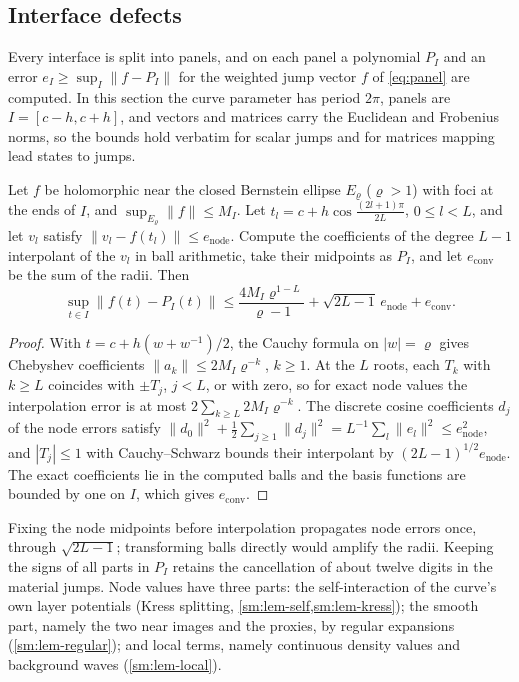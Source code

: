 \subsection{Interface defects}\label{sm:reliable-eps}
Every interface is split into panels, and on each panel a polynomial $P_I$ and an
error $e_I\ge\sup_I\|f-P_I\|$ for the weighted jump vector $f$ of \eqref{eq:panel}
are computed. In this section the curve parameter has period $2\pi$, panels are
$I=[c-h,c+h]$, and vectors and matrices carry the Euclidean and Frobenius norms,
so the bounds hold verbatim for scalar jumps and for matrices mapping lead states
to jumps.

\begin{lemma}\label{sm:lem-cheb}
Let $f$ be holomorphic near the closed Bernstein ellipse $E_\varrho$ ($\varrho>1$)
with foci at the ends of $I$, and $\sup_{E_\varrho}\|f\|\le M_I$. Let
$t_l=c+h\cos\frac{(2l+1)\pi}{2L}$, $0\le l<L$, and let $v_l$ satisfy
$\|v_l-f(t_l)\|\le e_{\mathrm{node}}$. Compute the coefficients of the degree $L-1$
interpolant of the $v_l$ in ball arithmetic, take their midpoints as $P_I$, and let
$e_{\mathrm{conv}}$ be the sum of the radii. Then
\begin{equation}\label{sm:eq-cheb}
  \sup_{t\in I}\|f(t)-P_I(t)\|\le\frac{4M_I\varrho^{1-L}}{\varrho-1}
  +\sqrt{2L-1}\,e_{\mathrm{node}}+e_{\mathrm{conv}} .
\end{equation}
\end{lemma}

\begin{proof}
With $t=c+h(w+w^{-1})/2$, the Cauchy formula on $|w|=\varrho$ gives Chebyshev
coefficients $\|a_k\|\le2M_I\varrho^{-k}$, $k\ge1$. At the $L$ roots, each $T_k$
with $k\ge L$ coincides with $\pm T_j$, $j<L$, or with zero, so for exact node
values the interpolation error is at most $2\sum_{k\ge L}2M_I\varrho^{-k}$. The
discrete cosine coefficients $d_j$ of the node errors satisfy
$\|d_0\|^2+\frac12\sum_{j\ge1}\|d_j\|^2=L^{-1}\sum_l\|e_l\|^2\le e_{\mathrm{node}}^2$,
and $|T_j|\le1$ with Cauchy--Schwarz bounds their interpolant by
$(2L-1)^{1/2}e_{\mathrm{node}}$. The exact coefficients lie in the computed balls
and the basis functions are bounded by one on $I$, which gives $e_{\mathrm{conv}}$.
\end{proof}

Fixing the node midpoints before interpolation propagates node errors once,
through $\sqrt{2L-1}$; transforming balls directly would amplify the radii. Keeping
the signs of all parts in $P_I$ retains the cancellation of about twelve digits in
the material jumps. Node values have three parts: the self-interaction of the
curve's own layer potentials (Kress splitting, \cref{sm:lem-self,sm:lem-kress});
the smooth part, namely the two near images and the proxies, by regular expansions
(\cref{sm:lem-regular}); and local terms, namely continuous density values and
background waves (\cref{sm:lem-local}).

